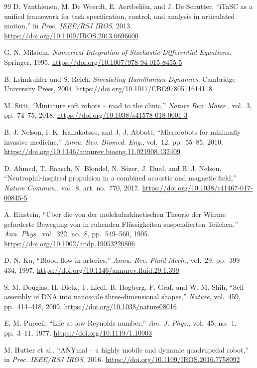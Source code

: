 \documentclass[11pt]{article}
\begin{document}
\begin{thebibliography}{99}
D. Vanthienen, M. De Weerdt, E. Aertbeli\"{e}n, and J. De Schutter,
``iTaSC as a unified framework for task specification, control, and analysis
in articulated motion,''
in \emph{Proc. IEEE/RSJ IROS}, 2013.
\url{https://doi.org/10.1109/IROS.2013.6696600}

G. N. Milstein,
\emph{Numerical Integration of Stochastic Differential Equations}.
Springer, 1995.
\url{https://doi.org/10.1007/978-94-015-8455-5}

B. Leimkuhler and S. Reich,
\emph{Simulating Hamiltonian Dynamics}.
Cambridge University Press, 2004.
\url{https://doi.org/10.1017/CBO9780511614118}

M. Sitti,
``Miniature soft robots -- road to the clinic,''
\emph{Nature Rev. Mater.}, vol.~3, pp.~74--75, 2018.
\url{https://doi.org/10.1038/s41578-018-0001-3}

B. J. Nelson, I. K. Kaliakatsos, and J. J. Abbott,
``Microrobots for minimally invasive medicine,''
\emph{Annu. Rev. Biomed. Eng.}, vol.~12, pp.~55--85, 2010.
\url{https://doi.org/10.1146/annurev.bioeng.11.021908.132409}

D. Ahmed, T. Baasch, N. Blondel, N. S\"{o}zer, J. Dual, and B. J. Nelson,
``Neutrophil-inspired propulsion in a combined acoustic and magnetic field,''
\emph{Nature Commun.}, vol.~8, art. no.~770, 2017.
\url{https://doi.org/10.1038/s41467-017-00845-5}

A. Einstein,
``\"{U}ber die von der molekularkinetischen Theorie der W\"{a}rme geforderte
Bewegung von in ruhenden Fl\"{u}ssigkeiten suspendierten Teilchen,''
\emph{Ann. Phys.}, vol.~322, no.~8, pp.~549--560, 1905.
\url{https://doi.org/10.1002/andp.19053220806}

D. N. Ku,
``Blood flow in arteries,''
\emph{Annu. Rev. Fluid Mech.}, vol.~29, pp.~399--434, 1997.
\url{https://doi.org/10.1146/annurev.fluid.29.1.399}

S. M. Douglas, H. Dietz, T. Liedl, B. Hogberg, F. Graf, and W. M. Shih,
``Self-assembly of DNA into nanoscale three-dimensional shapes,''
\emph{Nature}, vol.~459, pp.~414--418, 2009.
\url{https://doi.org/10.1038/nature08016}

E. M. Purcell,
``Life at low Reynolds number,''
\emph{Am. J. Phys.}, vol.~45, no.~1, pp.~3--11, 1977.
\url{https://doi.org/10.1119/1.10903}

M. Hutter et al.,
``ANYmal -- a highly mobile and dynamic quadrupedal robot,''
in \emph{Proc. IEEE/RSJ IROS}, 2016.
\url{https://doi.org/10.1109/IROS.2016.7758092}


\end{thebibliography}
\end{document}
